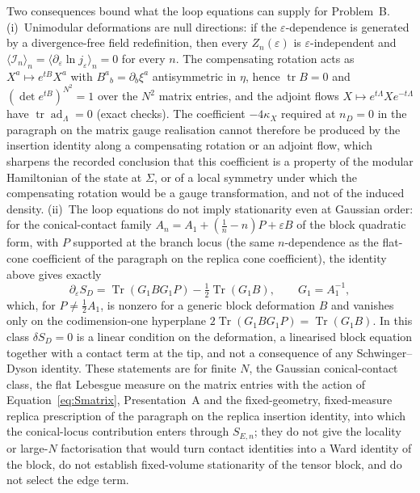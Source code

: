 Two consequences bound what the loop equations can supply for Problem~B. (i)~Unimodular deformations are null directions: if the \(\varepsilon\)-dependence is generated by a divergence-free field redefinition, then every \(Z_n(\varepsilon)\) is \(\varepsilon\)-independent and \(\langle\mathcal I_n\rangle_n=\langle\partial_\varepsilon\ln j_\varepsilon\rangle_n=0\) for every \(n\). The compensating rotation acts as \(X^a\mapsto e^{tB}X^a\) with \(B^a{}_b=\partial_b\xi^a\) antisymmetric in \(\eta\), hence \(\operatorname{tr}B=0\) and \((\det e^{tB})^{N^2}=1\) over the \(N^2\) matrix entries, and the adjoint flows \(X\mapsto e^{t\Lambda}Xe^{-t\Lambda}\) have \(\operatorname{tr}\operatorname{ad}_\Lambda=0\) (exact checks). The coefficient \(-4\kappa_X\) required at \(n_D=0\) in the paragraph on the matrix gauge realisation cannot therefore be produced by the insertion identity along a compensating rotation or an adjoint flow, which sharpens the recorded conclusion that this coefficient is a property of the modular Hamiltonian of the state at \(\Sigma\), or of a local symmetry under which the compensating rotation would be a gauge transformation, and not of the induced density. (ii)~The loop equations do not imply stationarity even at Gaussian order: for the conical-contact family \(A_n=A_1+(\tfrac1n-n)P+\varepsilon B\) of the block quadratic form, with \(P\) supported at the branch locus (the same \(n\)-dependence as the flat-cone coefficient of the paragraph on the replica cone coefficient), the identity above gives exactly
\[
  \partial_\varepsilon S_D=\operatorname{Tr}(G_1BG_1P)-\tfrac12\operatorname{Tr}(G_1B),\qquad G_1=A_1^{-1},
\]
which, for \(P\neq\tfrac12A_1\), is nonzero for a generic block deformation \(B\) and vanishes only on the codimension-one hyperplane \(2\operatorname{Tr}(G_1BG_1P)=\operatorname{Tr}(G_1B)\). In this class \(\delta S_D=0\) is a linear condition on the deformation, a linearised block equation together with a contact term at the tip, and not a consequence of any Schwinger--Dyson identity. These statements are for finite \(N\), the Gaussian conical-contact class, the flat Lebesgue measure on the matrix entries with the action of Equation~\eqref{eq:Smatrix}, Presentation~A and the fixed-geometry, fixed-measure replica prescription of the paragraph on the replica insertion identity, into which the conical-locus contribution enters through \(S_{E,n}\); they do not give the locality or large-\(N\) factorisation that would turn contact identities into a Ward identity of the block, do not establish fixed-volume stationarity of the tensor block, and do not select the edge term.

